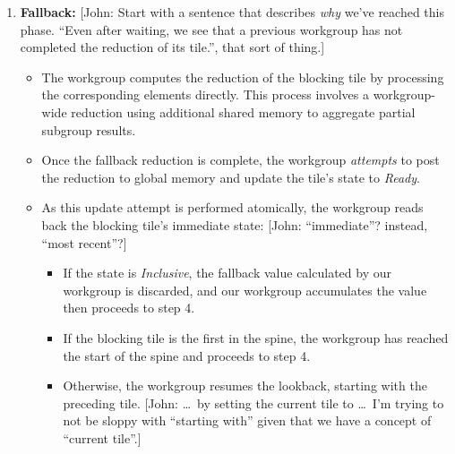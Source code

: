 \documentclass[sigconf]{acmart}
\newcommand{\john}[1]{{\footnotesize\color{cyan}[John: #1]}}
\begin{document}
\begin{enumerate}
  \item \textbf{Fallback:} \john{Start with a sentence that describes \emph{why} we've reached this phase. ``Even after waiting, we see that a previous workgroup has not completed the reduction of its tile.'', that sort of thing.}
        \begin{itemize}
          \item The workgroup computes the reduction of the blocking tile by processing the corresponding elements directly. This process involves a workgroup-wide reduction using additional shared memory to aggregate partial subgroup results.
          \item Once the fallback reduction is complete, the workgroup \emph{attempts} to post the reduction to global memory and update the tile's state to \emph{Ready}.
          \item As this update attempt is performed atomically, the workgroup reads back the blocking tile's immediate state: \john{``immediate''? instead, ``most recent''?}
                \begin{itemize}
                  \item If the state is \emph{Inclusive}, the fallback value calculated by our workgroup is discarded, and our workgroup accumulates the value then proceeds to step 4.
                  \item If the blocking tile is the first in the spine, the workgroup has reached the start of the spine and proceeds to step 4.
                  \item Otherwise, the workgroup resumes the lookback, starting with the preceding tile. \john{\ldots\ by setting the current tile to \ldots\ I'm trying to not be sloppy with ``starting with'' given that we have a concept of ``current tile''.}
                \end{itemize}
        \end{itemize}


\end{enumerate}
\end{document}

